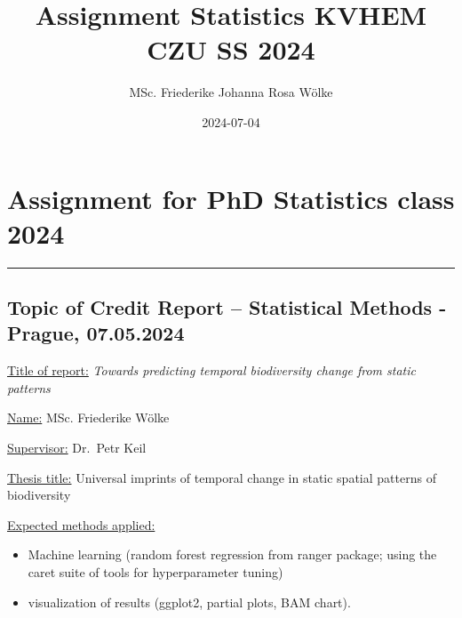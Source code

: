 \documentclass[
  letterpaper,
  DIV=11,
  numbers=noendperiod]{scrreprt}
\title{Assignment Statistics KVHEM CZU SS 2024}
\author{MSc. Friederike Johanna Rosa Wölke}
\date{2024-07-04}
\providecommand{\tightlist}{%
  \setlength{\itemsep}{0pt}\setlength{\parskip}{0pt}}\usepackage{longtable,booktabs,array}
\renewcommand*\contentsname{Table of contents}
\newcommand\contentsname{Table of contents}
\begin{document}
\maketitle

\renewcommand*\contentsname{Table of contents}
{
\hypersetup{linkcolor=}
\setcounter{tocdepth}{2}
\tableofcontents
}

\chapter*{Assignment for PhD Statistics class
2024}\label{assignment-for-phd-statistics-class-2024}


\begin{center}\rule{0.5\linewidth}{0.5pt}\end{center}

\section*{\texorpdfstring{\textbf{Topic of Credit Report -- Statistical
Methods} - Prague,
07.05.2024}{Topic of Credit Report -- Statistical Methods - Prague, 07.05.2024}}\label{topic-of-credit-report-statistical-methods---prague-07.05.2024}


\ul{Title of report:} \emph{Towards predicting temporal biodiversity
change from static patterns}

\ul{Name:} MSc. Friederike Wölke

\ul{Supervisor:} Dr.~Petr Keil

\ul{Thesis title:} Universal imprints of temporal change in static
spatial patterns of biodiversity

\ul{Expected methods applied:}

\begin{itemize}
\tightlist
\item
  Machine learning {(random forest regression from ranger package; using
  the caret suite of tools for hyperparameter tuning)}
\item
  visualization of results (ggplot2, partial plots, BAM chart).
\end{itemize}
\end{document}
